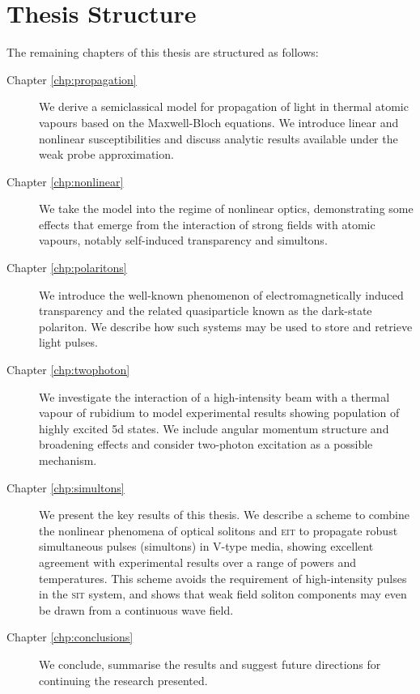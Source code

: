 \section{Thesis Structure}
  \label{sec:intro_structure}

  The remaining chapters of this thesis are structured as follows:

  \begin{description}
  \item[Chapter \ref{chp:propagation}]

    We derive a semiclassical model for propagation of light in thermal atomic
    vapours based on the Maxwell-Bloch equations. We introduce linear and
    nonlinear susceptibilities and discuss analytic results available under the
    weak probe approximation.

  \item[Chapter \ref{chp:nonlinear}]

    We take the model into the regime of nonlinear optics, demonstrating some
    effects that emerge from the interaction of strong fields with atomic
    vapours, notably self-induced transparency and simultons.

  \item[Chapter \ref{chp:polaritons}]

    We introduce the well-known phenomenon of electromagnetically induced
    transparency and the related quasiparticle known as the dark-state
    polariton. We describe how such systems may be used to store and retrieve
    light pulses.

  \item[Chapter \ref{chp:twophoton}]

    We investigate the interaction of a high-intensity beam with a thermal
    vapour of rubidium to model experimental results showing population of
    highly excited 5d states. We include angular momentum structure and
    broadening effects and consider two-photon excitation as a possible
    mechanism.

  \item[Chapter \ref{chp:simultons}]

    We present the key results of this thesis. We describe a scheme to combine
    the nonlinear phenomena of optical solitons and \textsc{eit} to propagate
    robust simultaneous pulses (simultons) in V-type media, showing excellent
    agreement with experimental results over a range of powers and temperatures.
    This scheme avoids the requirement of high-intensity pulses in the
    \textsc{sit} system, and shows that weak field soliton components may even
    be drawn from a continuous wave field.

  \item[Chapter \ref{chp:conclusions}]

    We conclude, summarise the results and suggest future directions for
    continuing the research presented.

\end{description}
